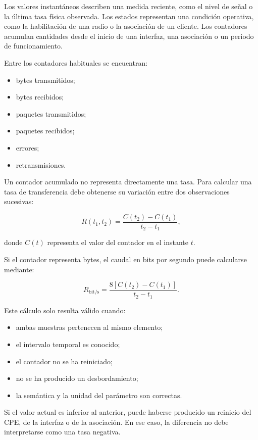 Los valores instantáneos describen una medida reciente, como el nivel de
señal o la última tasa física observada. Los estados representan una
condición operativa, como la habilitación de una radio o la asociación de
un cliente. Los contadores acumulan cantidades desde el inicio de una
interfaz, una asociación o un periodo de funcionamiento.

Entre los contadores habituales se encuentran:

\begin{itemize}
    \item bytes transmitidos;
    \item bytes recibidos;
    \item paquetes transmitidos;
    \item paquetes recibidos;
    \item errores;
    \item retransmisiones.
\end{itemize}

Un contador acumulado no representa directamente una tasa. Para calcular
una tasa de transferencia debe obtenerse su variación entre dos
observaciones sucesivas:

\[
    R(t_1,t_2)
    =
    \frac{
        C(t_2)-C(t_1)
    }{
        t_2-t_1
    },
\]

donde \(C(t)\) representa el valor del contador en el instante \(t\).

Si el contador representa bytes, el caudal en bits por segundo puede
calcularse mediante:

\[
    R_{\mathrm{bit/s}}
    =
    \frac{
        8\left[C(t_2)-C(t_1)\right]
    }{
        t_2-t_1
    }.
\]

Este cálculo solo resulta válido cuando:

\begin{itemize}
    \item ambas muestras pertenecen al mismo elemento;
    \item el intervalo temporal es conocido;
    \item el contador no se ha reiniciado;
    \item no se ha producido un desbordamiento;
    \item la semántica y la unidad del parámetro son correctas.
\end{itemize}

Si el valor actual es inferior al anterior, puede haberse producido un
reinicio del CPE, de la interfaz o de la asociación. En ese caso, la
diferencia no debe interpretarse como una tasa negativa.


